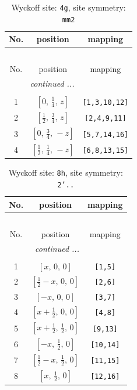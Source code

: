 \documentclass[fleqn,8pt]{jsarticle}
\begin{document}
\renewcommand{\arraystretch}{1.2}
\begin{longtable}{ccc}
\caption{Wyckoff site: {\tt 4g}, site symmetry: {\tt mm2}}
 \\
 \hline \hline
No. & position & mapping \\ \hline \endfirsthead

\multicolumn{2}{l}{\tablename\ \thetable{}} \\
 \hline \hline
No. & position & mapping \\ \hline \endhead

 \hline \hline
\multicolumn{2}{r}{\footnotesize\it continued ...} \\ \endfoot

 \hline \hline
\multicolumn{2}{r}{} \\ \endlastfoot

1 & $\left[ 0,\, \frac{1}{4},\, z \right]$ & {\tt [1,3,10,12]} \\ \hline
2 & $\left[ \frac{1}{2},\, \frac{3}{4},\, z \right]$ & {\tt [2,4,9,11]} \\ \hline
3 & $\left[ 0,\, \frac{3}{4},\, - z \right]$ & {\tt [5,7,14,16]} \\ \hline
4 & $\left[ \frac{1}{2},\, \frac{1}{4},\, - z \right]$ & {\tt [6,8,13,15]} \\
\end{longtable}
\renewcommand{\arraystretch}{1.2}
\begin{longtable}{ccc}
\caption{Wyckoff site: {\tt 8h}, site symmetry: {\tt 2'..}}
 \\
 \hline \hline
No. & position & mapping \\ \hline \endfirsthead

\multicolumn{2}{l}{\tablename\ \thetable{}} \\
 \hline \hline
No. & position & mapping \\ \hline \endhead

 \hline \hline
\multicolumn{2}{r}{\footnotesize\it continued ...} \\ \endfoot

 \hline \hline
\multicolumn{2}{r}{} \\ \endlastfoot

1 & $\left[ x,\, 0,\, 0 \right]$ & {\tt [1,5]} \\ \hline
2 & $\left[ \frac{1}{2} - x,\, 0,\, 0 \right]$ & {\tt [2,6]} \\ \hline
3 & $\left[ - x,\, 0,\, 0 \right]$ & {\tt [3,7]} \\ \hline
4 & $\left[ x + \frac{1}{2},\, 0,\, 0 \right]$ & {\tt [4,8]} \\ \hline
5 & $\left[ x + \frac{1}{2},\, \frac{1}{2},\, 0 \right]$ & {\tt [9,13]} \\ \hline
6 & $\left[ - x,\, \frac{1}{2},\, 0 \right]$ & {\tt [10,14]} \\ \hline
7 & $\left[ \frac{1}{2} - x,\, \frac{1}{2},\, 0 \right]$ & {\tt [11,15]} \\ \hline
8 & $\left[ x,\, \frac{1}{2},\, 0 \right]$ & {\tt [12,16]} \\
\end{longtable}
\end{document}
